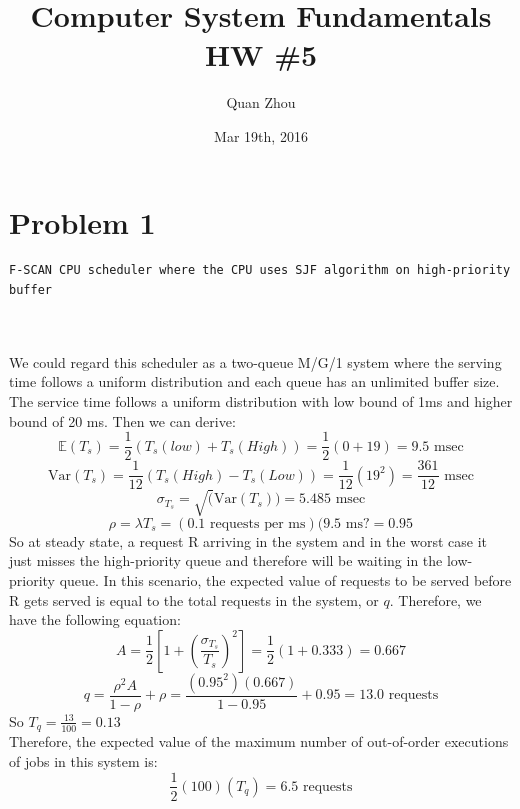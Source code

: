 \documentclass{article}   	                         %
\title{Computer System Fundamentals HW \#5}
\author{Quan Zhou}
\date{Mar 19th, 2016}
\begin{document}
\maketitle
\section*{Problem 1}
\begin{BVerbatim}
F-SCAN CPU scheduler where the CPU uses SJF algorithm on high-priority buffer
\end{BVerbatim}
\\
\\
We could regard this scheduler as a two-queue M/G/1 system where the serving time follows a uniform distribution and each queue has an unlimited buffer size. The service time follows a uniform distribution with low bound of 1ms and higher bound of 20 ms. Then we can derive:\\
\begin{equation} \mathds{E}(T_s) = \frac{1}{2}\left(T_s(low) + T_s(High)\right) = \frac{1}{2}(0+19) = 9.5 \text {  msec}\end{equation} 
\begin{equation} \text{Var}(T_s) = \frac{1}{12}\left(T_s(High) - T_s(Low)\right) = \frac{1}{12}(19^2) = \frac{361}{12} \text {  msec}\end{equation} 
\begin{equation} \sigma_{T_s} = \sqrt(\text{Var}(T_s)) =  5.485 \text {  msec}\end{equation} 
\begin{equation}\rho = \lambda T_s = (0.1 \text {  requests per ms} )(9.5 \text {  ms} ?= 0.95 \end{equation}
So at steady state, a request R arriving in the system and in the worst case it just misses the high-priority queue and therefore will be waiting in the low-priority queue. In this scenario, the expected value of requests to be served before R gets served is equal to the total requests in the system, or $q$. Therefore, we have the following equation:\\
\begin{equation} A = \frac{1}{2}\left[1 + \left(\frac{\sigma_{T_s}}{T_s}\right)^2\right] = \frac{1}{2}(1 + 0.333) = 0.667\end{equation}
\begin{equation} q = \frac{\rho^2 A}{1 - \rho} + \rho = \frac{(0.95^2)(0.667)}{1- 0.95} + 0.95 = 13.0 \text{  requests} \end{equation}  
So $T_q = \frac{13}{100} = 0.13$\\
Therefore, the expected value of the maximum number of out-of-order executions of jobs in this system is:\\
\begin{equation}\frac{1}{2}(100)(T_q) = 6.5 \text{    requests}\end{equation}
\end{document}
